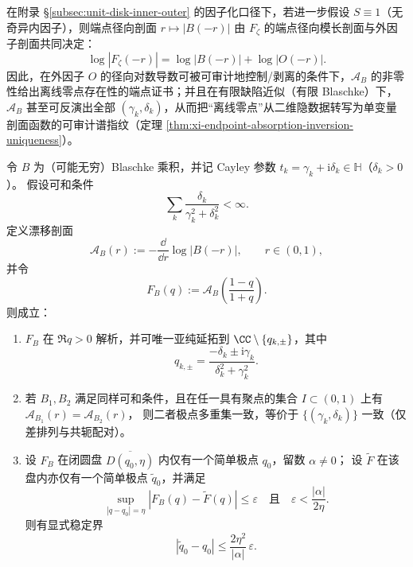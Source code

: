 \begin{corollary}\label{cor:xi-endpoint-tomography-certificate-chain}
在附录 \S\ref{subsec:unit-disk-inner-outer} 的因子化口径下，若进一步假设 \(S\equiv 1\)（无奇异内因子），则端点径向剖面 \(r\mapsto |B(-r)|\) 由 \(F_\zeta\) 的端点径向模长剖面与外因子剖面共同决定：
\[
\log|F_\zeta(-r)|=\log|B(-r)|+\log|O(-r)|.
\]
因此，在外因子 \(O\) 的径向对数导数可被可审计地控制/剥离的条件下，\(\mathcal{A}_B\) 的非零性给出离线零点存在性的端点证书；并且在有限缺陷近似（有限 Blaschke）下，\(\mathcal{A}_B\) 甚至可反演出全部 \((\gamma_k,\delta_k)\)，从而把“离线零点”从二维隐数据转写为单变量剖面函数的可审计谱指纹（定理 \ref{thm:xi-endpoint-absorption-inversion-uniqueness}）。
\end{corollary}

\begin{theorem}\label{thm:xi-endpoint-infinite-blaschke-drift-identifiability-stability}
令 \(B\) 为（可能无穷）Blaschke 乘积，并记 Cayley 参数
\(
t_k=\gamma_k+\mathrm{i}\delta_k\in\mathbb H
\)（\(\delta_k>0\)）。
假设可和条件
\[
\sum_k\frac{\delta_k}{\gamma_k^2+\delta_k^2}<\infty.
\]
定义漂移剖面
\[
\mathcal A_B(r):=-\frac{\dd}{\dd r}\log|B(-r)|,\qquad r\in(0,1),
\]
并令
\[
F_B(q):=\mathcal A_B\!\left(\frac{1-q}{1+q}\right).
\]
则成立：
\begin{enumerate}
  \item \(F_B\) 在 \(\Re q>0\) 解析，并可唯一亚纯延拓到
  \(
  \CC\setminus\{q_{k,\pm}\}
  \)，其中
  \[
  q_{k,\pm}=\frac{-\delta_k\pm \mathrm{i}\gamma_k}{\delta_k^2+\gamma_k^2}.
  \]
  \item 若 \(B_1,B_2\) 满足同样可和条件，且在任一具有聚点的集合
  \(I\subset(0,1)\) 上有
  \(
  \mathcal A_{B_1}(r)=\mathcal A_{B_2}(r)
  \)，
  则二者极点多重集一致，等价于
  \(
  \{(\gamma_k,\delta_k)\}
  \)
  一致（仅差排列与共轭配对）。
  \item 设 \(F_B\) 在闭圆盘 \(\overline{D(q_0,\eta)}\) 内仅有一个简单极点 \(q_0\)，留数 \(\alpha\neq 0\)；
  设 \(\widetilde F\) 在该盘内亦仅有一个简单极点 \(\widetilde q_0\)，并满足
  \[
  \sup_{|q-q_0|=\eta}|F_B(q)-\widetilde F(q)|\le \varepsilon
  \quad\text{且}\quad
  \varepsilon<\frac{|\alpha|}{2\eta}.
  \]
  则有显式稳定界
  \[
  |\widetilde q_0-q_0|
  \le
  \frac{2\eta^2}{|\alpha|}\,\varepsilon.
  \]
\end{enumerate}
\end{theorem}


